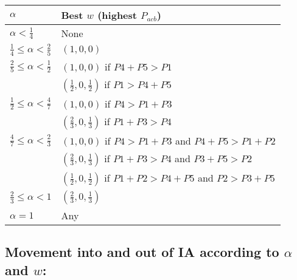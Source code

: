 \documentclass[12pt]{article}
\begin{document}
\begin{table}[H]
\centering
\begin{tabular}{l|l}
\textbf{$\alpha$}                       & \textbf{Best $w$ (highest $P_{acb}$)}                                  \\ \hline
$\alpha < \frac{1}{4}$                  & None                                                                    \\ \hline
$\frac{1}{4} \leq \alpha < \frac{2}{5}$ & $(1,0,0)$                                                               \\ \hline
$\frac{2}{5} \leq \alpha < \frac{1}{2}$ & $(1,0,0)$ if $P4 + P5 > P1$                                             \\
                                        & $(\frac{1}{2},0,\frac{1}{2})$ if $P1 > P4 + P5$                         \\ \hline
$\frac{1}{2} \leq \alpha < \frac{4}{7}$ & $(1,0,0)$ if $P4 > P1 + P3$                                             \\
                                        & $(\frac{2}{3},0,\frac{1}{3})$ if $P1 + P3 > P4$                         \\ \hline
$\frac{4}{7} \leq \alpha < \frac{2}{3}$ & $(1,0,0)$ if $P4 > P1 + P3$ and $P4 + P5 > P1 + P2$                     \\
                                        & $(\frac{2}{3},0,\frac{1}{3})$ if $P1 + P3 > P4$ and $P3 + P5 > P2$      \\
                                        & $(\frac{1}{2},0,\frac{1}{2})$ if $P1 + P2 > P4 + P5$ and $P2 > P3 + P5$ \\ \hline
$\frac{2}{3} \leq \alpha < 1$           & $(\frac{2}{3},0,\frac{1}{3})$                                           \\ \hline
$\alpha = 1$                            & Any                                                               
\end{tabular}
\end{table}

\subsection*{\normalsize Movement into and out of IA according to $\alpha$ and $w$:}
\end{document}
